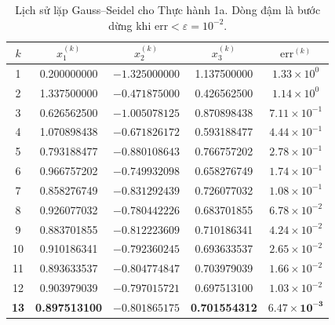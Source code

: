 \documentclass[12pt,a4paper]{article}
\begin{document}
\begin{table}[H]
    \centering
    \small
    \begin{tabular}{ccccc}
        \toprule
        $k$ & $x_1^{(k)}$ & $x_2^{(k)}$ & $x_3^{(k)}$ & $\mathrm{err}^{(k)}$ \\
        \midrule
        1  &  0.200000000 & $-1.325000000$ &  1.137500000 & $1.33\times 10^0$ \\
        2  &  1.337500000 & $-0.471875000$ &  0.426562500 & $1.14\times 10^0$ \\
        3  &  0.626562500 & $-1.005078125$ &  0.870898438 & $7.11\times 10^{-1}$ \\
        4  &  1.070898438 & $-0.671826172$ &  0.593188477 & $4.44\times 10^{-1}$ \\
        5  &  0.793188477 & $-0.880108643$ &  0.766757202 & $2.78\times 10^{-1}$ \\
        6  &  0.966757202 & $-0.749932098$ &  0.658276749 & $1.74\times 10^{-1}$ \\
        7  &  0.858276749 & $-0.831292439$ &  0.726077032 & $1.08\times 10^{-1}$ \\
        8  &  0.926077032 & $-0.780442226$ &  0.683701855 & $6.78\times 10^{-2}$ \\
        9  &  0.883701855 & $-0.812223609$ &  0.710186341 & $4.24\times 10^{-2}$ \\
        10 &  0.910186341 & $-0.792360245$ &  0.693633537 & $2.65\times 10^{-2}$ \\
        11 &  0.893633537 & $-0.804774847$ &  0.703979039 & $1.66\times 10^{-2}$ \\
        12 &  0.903979039 & $-0.797015721$ &  0.697513100 & $1.03\times 10^{-2}$ \\
        \textbf{13} &  \textbf{0.897513100} & $\mathbf{-0.801865175}$ &  \textbf{0.701554312} & $\mathbf{6.47\times 10^{-3}}$ \\
        \bottomrule
    \end{tabular}
    \caption{Lịch sử lặp Gauss--Seidel cho Thực hành 1a. Dòng đậm là bước dừng khi $\mathrm{err} < \varepsilon = 10^{-2}$.}
    \label{tab:1a}
\end{table}
\end{document}
